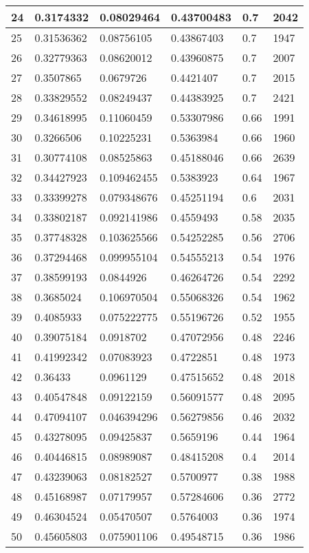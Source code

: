 \begin{longtable}{|l|l|l|l|l|l|}
24 & 0.3174332 & 0.08029464 & 0.43700483 & 0.7 & 2042 \\ \hline 
25 & 0.31536362 & 0.08756105 & 0.43867403 & 0.7 & 1947 \\ \hline 
26 & 0.32779363 & 0.08620012 & 0.43960875 & 0.7 & 2007 \\ \hline 
27 & 0.3507865 & 0.0679726 & 0.4421407 & 0.7 & 2015 \\ \hline 
28 & 0.33829552 & 0.08249437 & 0.44383925 & 0.7 & 2421 \\ \hline 
29 & 0.34618995 & 0.11060459 & 0.53307986 & 0.66 & 1991 \\ \hline 
30 & 0.3266506 & 0.10225231 & 0.5363984 & 0.66 & 1960 \\ \hline 
31 & 0.30774108 & 0.08525863 & 0.45188046 & 0.66 & 2639 \\ \hline 
32 & 0.34427923 & 0.109462455 & 0.5383923 & 0.64 & 1967 \\ \hline 
33 & 0.33399278 & 0.079348676 & 0.45251194 & 0.6 & 2031 \\ \hline 
34 & 0.33802187 & 0.092141986 & 0.4559493 & 0.58 & 2035 \\ \hline 
35 & 0.37748328 & 0.103625566 & 0.54252285 & 0.56 & 2706 \\ \hline 
36 & 0.37294468 & 0.099955104 & 0.54555213 & 0.54 & 1976 \\ \hline 
37 & 0.38599193 & 0.0844926 & 0.46264726 & 0.54 & 2292 \\ \hline 
38 & 0.3685024 & 0.106970504 & 0.55068326 & 0.54 & 1962 \\ \hline 
39 & 0.4085933 & 0.075222775 & 0.55196726 & 0.52 & 1955 \\ \hline 
40 & 0.39075184 & 0.0918702 & 0.47072956 & 0.48 & 2246 \\ \hline 
41 & 0.41992342 & 0.07083923 & 0.4722851 & 0.48 & 1973 \\ \hline 
42 & 0.36433 & 0.0961129 & 0.47515652 & 0.48 & 2018 \\ \hline 
43 & 0.40547848 & 0.09122159 & 0.56091577 & 0.48 & 2095 \\ \hline 
44 & 0.47094107 & 0.046394296 & 0.56279856 & 0.46 & 2032 \\ \hline 
45 & 0.43278095 & 0.09425837 & 0.5659196 & 0.44 & 1964 \\ \hline 
46 & 0.40446815 & 0.08989087 & 0.48415208 & 0.4 & 2014 \\ \hline 
47 & 0.43239063 & 0.08182527 & 0.5700977 & 0.38 & 1988 \\ \hline 
48 & 0.45168987 & 0.07179957 & 0.57284606 & 0.36 & 2772 \\ \hline 
49 & 0.46304524 & 0.05470507 & 0.5764003 & 0.36 & 1974 \\ \hline 
50 & 0.45605803 & 0.075901106 & 0.49548715 & 0.36 & 1986 \\ \hline 
\end{longtable}